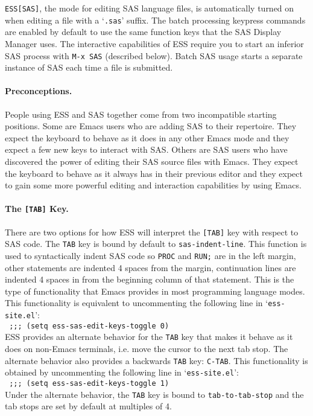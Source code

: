 \documentclass{article}
\newcommand{\stexttt}[1]{{\small\texttt{#1}}}
\newcommand{\elcode}[1]{\\{\stexttt{\hspace*{2em} #1}}\\}
\newcommand{\file}[1]{`\stexttt{#1}'}
\begin{document}
\stexttt{ESS[SAS]}, the mode for editing SAS language files, is automatically
turned on when editing a file with a \file{.sas} suffix.
The batch processing keypress commands are
enabled by default to use the same function keys that the SAS Display
Manager uses.  The interactive capabilities of ESS require you to
start an inferior SAS process with \stexttt{M-x SAS} (described below).
Batch SAS usage starts a separate instance of SAS each time a file is submitted.


\paragraph{Preconceptions.}

People using ESS and SAS together come from two incompatible starting positions.
Some are Emacs users who are adding SAS to their repertoire.  They expect the 
keyboard to behave as it does in any other Emacs mode and they expect a few new
keys to interact with SAS.  Others are SAS users who have discovered the
power of editing their SAS source files with Emacs.  They expect the keyboard
to behave as it always has in their previous editor and they expect to gain some
more powerful editing and interaction capabilities by using Emacs.


\paragraph{The \texttt{[TAB]} Key.}
\label{sec:SAS:tab}

There are two options for how ESS will interpret the \stexttt{[TAB]} key
with respect to SAS code.  The \stexttt{TAB} key is bound by default to
\stexttt{sas-indent-line}.  This function is used to syntactically indent SAS
code so \stexttt{PROC} and \stexttt{RUN;} are in the left margin, other
statements are indented 4 spaces from the margin, continuation lines
are indented 4 spaces in from the beginning column of that statement.
This is the type of functionality that Emacs provides in most
programming language modes.  This functionality is equivalent to
uncommenting the following line in \file{ess-site.el}:
\elcode{;;; (setq ess-sas-edit-keys-toggle 0)}
ESS provides an alternate behavior for the \stexttt{TAB} key that makes it
behave as it does on non-Emacs terminals, i.e. move the cursor to the
next tab stop.  The alternate behavior also provides a backwards \stexttt{TAB}
key: \stexttt{C-TAB}.  This functionality is obtained by
uncommenting the following line in \file{ess-site.el}:
\elcode{;;; (setq ess-sas-edit-keys-toggle 1)}
Under the alternate behavior, the \stexttt{TAB} key is bound to
\stexttt{tab-to-tab-stop} and the tab stops are set by default at multiples
of 4.
\end{document}
